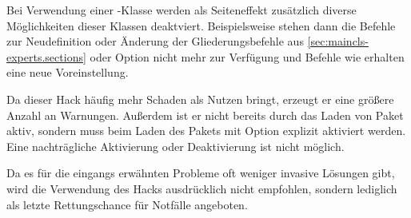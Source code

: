 Bei Verwendung einer \KOMAScript-Klasse werden als Seiteneffekt zusätzlich
diverse Möglichkeiten dieser Klassen deaktviert. Beispielsweise stehen dann
die Befehle zur Neudefinition oder Änderung der Gliederungsbefehle aus
\autoref{sec:maincls-experts.sections} oder Option
 nicht mehr zur Verfügung und Befehle wie
 erhalten eine neue Voreinstellung.

Da dieser Hack häufig mehr Schaden als Nutzen bringt, erzeugt er eine größere
Anzahl an Warnungen. Außerdem ist er nicht bereits durch das Laden von Paket
 aktiv, sondern muss beim Laden des Pakets mit Option
 explizit
aktiviert werden. Eine nachträgliche Aktivierung oder Deaktivierung ist nicht
möglich.

Da es für die eingangs erwähnten Probleme oft weniger invasive Lösungen gibt,
wird die Verwendung des Hacks ausdrücklich nicht empfohlen, sondern lediglich
als letzte Rettungschance für Notfälle angeboten.%
\EndIndexGroup


